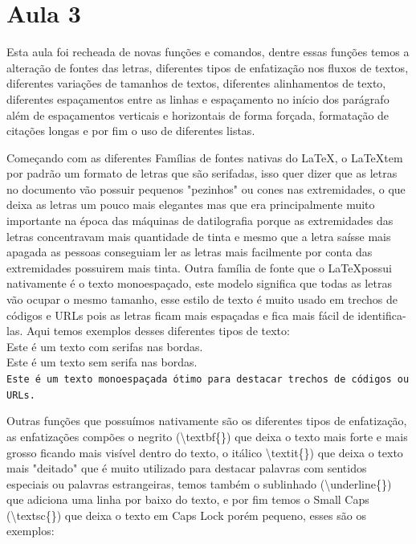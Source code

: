 \section{Aula 3}
Esta aula foi recheada de novas funções e comandos, dentre essas funções temos a alteração de fontes das letras, diferentes tipos de enfatização nos fluxos de textos, diferentes variações de tamanhos de textos, diferentes alinhamentos de texto, diferentes espaçamentos entre as linhas e espaçamento no início dos parágrafo além de espaçamentos verticais e horizontais de forma forçada, formatação de citações longas e por fim o uso de diferentes listas.

Começando com as diferentes Famílias de fontes nativas do \LaTeX, o \LaTeX tem por padrão um formato de letras que são serifadas, isso quer dizer que as letras no documento vão possuir pequenos "pezinhos" ou cones nas extremidades, o que deixa as letras um pouco mais elegantes mas que era principalmente muito importante na época das máquinas de datilografia porque as extremidades das letras concentravam mais quantidade de tinta e mesmo que a letra saísse mais apagada as pessoas conseguiam ler as letras mais facilmente por conta das extremidades possuirem mais tinta. Outra família de fonte que o \LaTeX possui nativamente é o texto monoespaçado, este modelo significa que todas as letras vão ocupar o mesmo tamanho, esse estilo de texto é muito usado em trechos de códigos e URLs pois as letras ficam mais espaçadas e fica mais fácil de identifica-las. Aqui temos exemplos desses diferentes tipos de texto:\\

\noindent Este é um texto com serifas nas bordas.\\
\textsf{Este é um texto sem serifa nas bordas.}\\
\texttt{Este é um texto monoespaçada ótimo para destacar trechos de códigos ou URLs.}

Outras funções que possuímos nativamente são os diferentes tipos de enfatização, as enfatizações compões o negrito (\textbackslash textbf\{\}) que deixa o texto mais forte e mais grosso ficando mais visível dentro do texto, o itálico \textbackslash textit\{\}) que deixa o texto mais "deitado" que é muito utilizado para destacar palavras com sentidos especiais ou palavras estrangeiras, temos também o sublinhado (\textbackslash underline\{\}) que adiciona uma linha por baixo do texto, e por fim temos o Small Caps (\textbackslash textsc\{\}) que deixa o texto em Caps Lock porém pequeno, esses são os exemplos:\\

